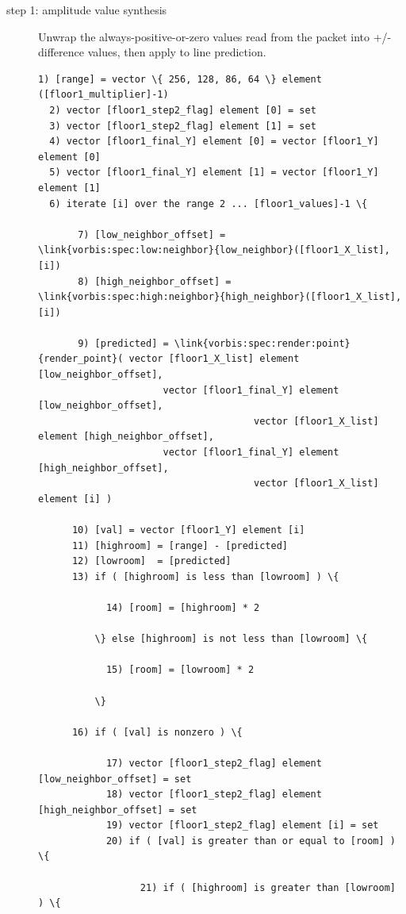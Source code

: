 \begin{description}
\item[step 1: amplitude value synthesis]

Unwrap the always-positive-or-zero values read from the packet into
+/- difference values, then apply to line prediction.

\begin{Verbatim}[commandchars=\\\{\}]
  1) [range] = vector \{ 256, 128, 86, 64 \} element ([floor1_multiplier]-1)
  2) vector [floor1_step2_flag] element [0] = set
  3) vector [floor1_step2_flag] element [1] = set
  4) vector [floor1_final_Y] element [0] = vector [floor1_Y] element [0]
  5) vector [floor1_final_Y] element [1] = vector [floor1_Y] element [1]
  6) iterate [i] over the range 2 ... [floor1_values]-1 \{

       7) [low_neighbor_offset] = \link{vorbis:spec:low:neighbor}{low_neighbor}([floor1_X_list],[i])
       8) [high_neighbor_offset] = \link{vorbis:spec:high:neighbor}{high_neighbor}([floor1_X_list],[i])

       9) [predicted] = \link{vorbis:spec:render:point}{render_point}( vector [floor1_X_list] element [low_neighbor_offset],
				      vector [floor1_final_Y] element [low_neighbor_offset],
                                      vector [floor1_X_list] element [high_neighbor_offset],
				      vector [floor1_final_Y] element [high_neighbor_offset],
                                      vector [floor1_X_list] element [i] )

      10) [val] = vector [floor1_Y] element [i]
      11) [highroom] = [range] - [predicted]
      12) [lowroom]  = [predicted]
      13) if ( [highroom] is less than [lowroom] ) \{

            14) [room] = [highroom] * 2

          \} else [highroom] is not less than [lowroom] \{

            15) [room] = [lowroom] * 2

          \}

      16) if ( [val] is nonzero ) \{

            17) vector [floor1_step2_flag] element [low_neighbor_offset] = set
            18) vector [floor1_step2_flag] element [high_neighbor_offset] = set
            19) vector [floor1_step2_flag] element [i] = set
            20) if ( [val] is greater than or equal to [room] ) \{

                  21) if ( [highroom] is greater than [lowroom] ) \{


\end{Verbatim}
\end{description}

